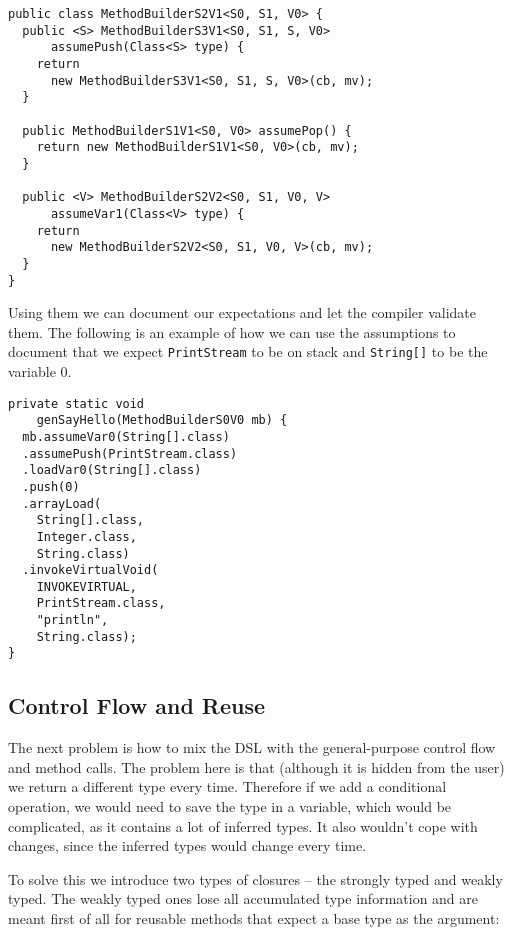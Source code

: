 \documentclass{sig-alternate}
\begin{document}
\begin{verbatim}
public class MethodBuilderS2V1<S0, S1, V0> {
  public <S> MethodBuilderS3V1<S0, S1, S, V0> 
      assumePush(Class<S> type) {
    return 
      new MethodBuilderS3V1<S0, S1, S, V0>(cb, mv);
  }

  public MethodBuilderS1V1<S0, V0> assumePop() {
    return new MethodBuilderS1V1<S0, V0>(cb, mv);
  }

  public <V> MethodBuilderS2V2<S0, S1, V0, V> 
      assumeVar1(Class<V> type) {
    return 
      new MethodBuilderS2V2<S0, S1, V0, V>(cb, mv);
  }  
}	
\end{verbatim}

Using them we can document our expectations and let the compiler validate them. The following is an example of how we can use the assumptions to document that we expect \verb!PrintStream! to be on stack and \verb!String[]! to be the variable $0$.

\begin{verbatim}
private static void 
    genSayHello(MethodBuilderS0V0 mb) {
  mb.assumeVar0(String[].class)
  .assumePush(PrintStream.class)
  .loadVar0(String[].class)
  .push(0)
  .arrayLoad(
    String[].class, 
    Integer.class,
    String.class)
  .invokeVirtualVoid(
    INVOKEVIRTUAL, 
    PrintStream.class, 
    "println", 
    String.class);
}
\end{verbatim}

\subsection{Control Flow and Reuse}

The next problem is how to mix the DSL with the general-purpose control flow and method calls. The problem here is that (although it is hidden from the user) we return a different type every time. Therefore if we add a conditional operation, we would need to save the type in a variable, which would be complicated, as it contains a lot of inferred types. It also wouldn't cope with changes, since the inferred types would change every time. 

To solve this we introduce two types of closures -- the strongly typed and weakly typed. The weakly typed ones lose all accumulated type information and are meant first of all for reusable methods that expect a base type as the argument:
\end{document}
